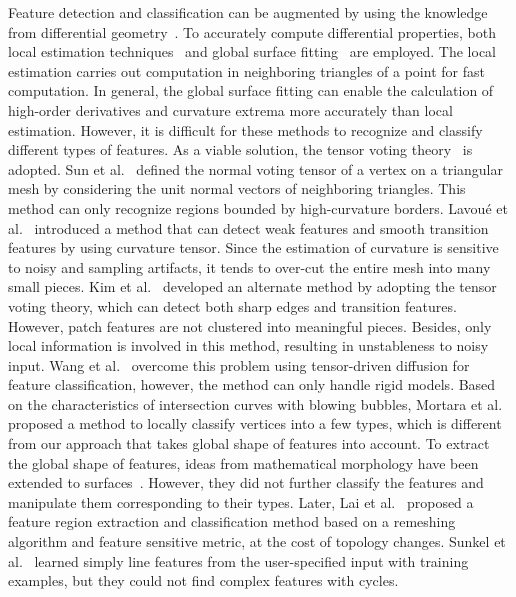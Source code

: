 \documentclass[10pt,journal,cspaper,compsoc]{IEEEtran}
\begin{document}
Feature detection and classification can be augmented by using the
knowledge from differential geometry~\cite{BAK97,KKM05}. To accurately
compute differential properties, both local estimation
techniques~\cite{SF04,CRT04,SAH05,RDo06} and global surface
fitting~\cite{KMWJ96,OBS04} are employed. The local estimation carries
out computation in neighboring triangles of a point for fast
computation. In general, the global surface fitting can enable the
calculation of high-order derivatives and curvature extrema more
accurately than local estimation. However, it is difficult for these
methods to recognize and classify different types of features. As a
viable solution, the tensor voting theory~\cite{GM00,MLT00} is
adopted. Sun et al.~\cite{PSKP*02} defined the normal voting tensor of
a vertex on a triangular mesh by considering the unit normal vectors
of neighboring triangles. This method can only recognize regions
bounded by high-curvature borders. Lavou\'e et al.~\cite{LDB05}
introduced a method that can detect weak features and smooth
transition features by using curvature tensor. Since the estimation of
curvature is sensitive to noisy and sampling artifacts, it tends to
over-cut the entire mesh into many small pieces. Kim et
al.~\cite{KCL09} developed an alternate method by adopting the tensor
voting theory, which can detect both sharp edges and transition
features. However, patch features are not clustered into meaningful
pieces. Besides, only local information is involved in this method,
resulting in unstableness to noisy input.  Wang et al.~\cite{whsq11_b}
overcome this problem using tensor-driven diffusion for feature
classification, however, the method can only handle rigid models.
Based on the characteristics of intersection curves with blowing
bubbles, Mortara et al.~\cite{MPGM*03} proposed a method to locally
classify vertices into a few types, which is different from our
approach that takes global shape of features into account. To extract
the global shape of features, ideas from mathematical morphology have
been extended to surfaces~\cite{RKSS00}. However, they did not further
classify the features and manipulate them corresponding to their
types. Later, Lai et al.~\cite{LZHW*07} proposed a feature region
extraction and classification method based on a remeshing algorithm
and feature sensitive metric, at the cost of topology changes. Sunkel
et al.~\cite{SJW*11} learned simply line features from the
user-specified input with training examples, but they could not find
complex features with cycles.
\end{document}
